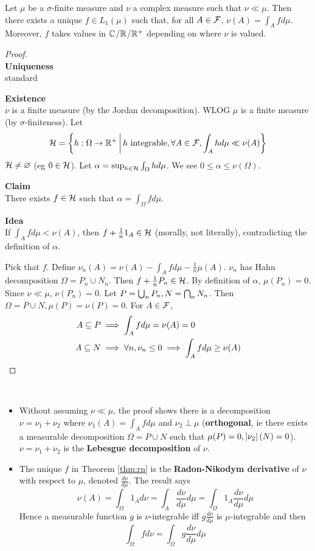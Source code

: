 \documentclass{article}
\begin{document}
\begin{nthm}\label{thm:rn}
  Let $\mu$ be a $\sigma$-finite measure and $\nu$ a complex measure such that $\nu \ll \mu$. Then there exists a unique $f \in L_1(\mu)$ such that, for all $A \in \mathcal F$, $\nu(A) = \int_A f d\mu$. Moreover, $f$ takes values in $\mathbb C$/$\mathbb R$/$\mathbb R^+$ depending on where $\nu$ is valued.
\end{nthm}
\begin{proof}~\\
  {\bf Uniqueness} \\
  standard

  {\bf Existence} \\
  $\nu$ is a finite measure (by the Jordan decomposition). WLOG $\mu$ is a finite measure (by $\sigma$-finiteness). Let
  $$\mathcal H = \left\{ h : \Omega \rightarrow \mathbb R^+ \,\middle|\, h \text{ integrable}, \forall A \in \mathcal F, \int_A h d\mu \ll \nu(A)\right\}$$
  $\mathcal H \ne \varnothing$ (eg $0 \in \mathcal H$). Let $\alpha = \sup_{h \in \mathcal H} \int_\Omega h d\mu$. We see $0 \le \alpha \le \nu(\Omega)$.

  {\bf Claim} \\
  There exists $f \in \mathcal H$ such that $\alpha = \int_\Omega f d\mu$.

  {\bf Idea} \\
  If $\int_A fd\mu < \nu(A)$, then $f + \frac 1 n 1_A \in \mathcal H$ (morally, not literally), contradicting the definition of $\alpha$.

  Pick that $f$. Define $\nu_n(A) = \nu(A) - \int_A fd\mu - \frac 1n \mu(A)$. $\nu_n$ has Hahn decomposition $\Omega = P_n \cup N_n$. Then $f + \frac 1n P_n \in \mathcal H$. By definition of $\alpha$, $\mu(P_n) = 0$. Since $\nu \ll \mu$, $\nu(P_n) = 0$. Let $P = \bigcup_n P_n, N = \bigcap_n N_n$. Then $\Omega = P \cup N, \mu(P) = \nu(P) = 0$. For $A \in \mathcal F$,
  \begin{align*}
    A \subseteq P & \implies \int_A fd\mu = \nu(A) = 0 \\
    A \subseteq N & \implies \forall n, \nu_n \le 0 \implies \int_A fd\mu \ge \nu(A)
  \end{align*}
\end{proof}

\begin{rmks}~
  \begin{itemize}
    \item Without assuming $\nu \ll \mu$, the proof shows there is a decomposition $\nu = \nu_1 + \nu_2$ where $\nu_1(A) = \int_A fd\mu$ and $\nu_2 \perp \mu$ ({\bf orthogonal}, ie there exists a measurable decomposition $\Omega = P \cup N$ such that $\mu(P) = 0, \left\lvert \nu_2\right\rvert(N) = 0$). $\nu = \nu_1 + \nu_2$ is the {\bf Lebesgue decomposition} of $\nu$.
    \item The unique $f$ in Theorem \ref{thm:rn} is the {\bf Radon-Nikodym derivative} of $\nu$ with respect to $\mu$, denoted $\frac{d\nu}{d\mu}$. The result says
    $$\nu(A) = \int_\Omega 1_A d\nu = \int_A \frac{d\nu}{d\mu} d\mu = \int_\Omega 1_A \frac{d\nu}{d\mu} d\mu$$
    Hence a measurable function $g$ is $\nu$-integrable iff $g\frac{d\nu}{d\mu}$ is $\mu$-integrable and then
    $$\int_\Omega f d\nu = \int_\Omega g \frac{d\nu}{d\mu} d\mu$$
  \end{itemize}
\end{rmks}
\end{document}
